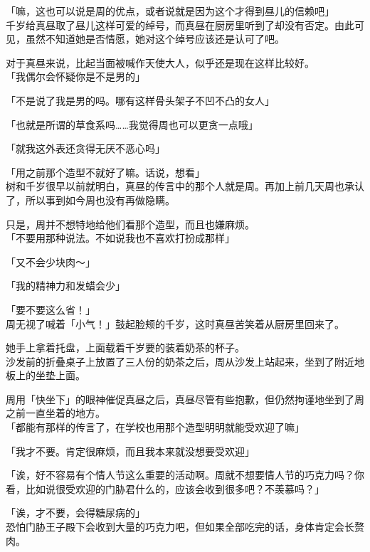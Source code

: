 「嘛，这也可以说是周的优点，或者说就是因为这个才得到昼儿的信赖吧」\\

千岁给真昼取了昼儿这样可爱的绰号，而真昼在厨房里听到了却没有否定。由此可见，虽然不知道她是否情愿，她对这个绰号应该还是认可了吧。

对于真昼来说，比起当面被喊作天使大人，似乎还是现在这样比较好。\\

「我偶尔会怀疑你是不是男的」

「不是说了我是男的吗。哪有这样骨头架子不凹不凸的女人」

「也就是所谓的草食系吗……我觉得周也可以更贪一点哦」

「就我这外表还贪得无厌不恶心吗」

「用之前那个造型不就好了嘛。话说，想看」\\

树和千岁很早以前就明白，真昼的传言中的那个人就是周。再加上前几天周也承认了，所以事到如今周也没有再做隐瞒。

只是，周并不想特地给他们看那个造型，而且也嫌麻烦。\\

「不要用那种说法。不如说我也不喜欢打扮成那样」

「又不会少块肉～」

「我的精神力和发蜡会少」

「要不要这么省！」\\

周无视了喊着「小气！」鼓起脸颊的千岁，这时真昼苦笑着从厨房里回来了。

她手上拿着托盘，上面载着千岁要的装着奶茶的杯子。\\

沙发前的折叠桌子上放置了三人份的奶茶之后，周从沙发上站起来，坐到了附近地板上的坐垫上面。

周用「快坐下」的眼神催促真昼之后，真昼尽管有些抱歉，但仍然拘谨地坐到了周之前一直坐着的地方。\\

「都能有那样的传言了，在学校也用那个造型明明就能受欢迎了嘛」

「我才不要。肯定很麻烦，而且我本来就没想要受欢迎」

「诶，好不容易有个情人节这么重要的活动啊。周就不想要情人节的巧克力吗？你看，比如说很受欢迎的门胁君什么的，应该会收到很多吧？不羡慕吗？」

「诶，才不要，会得糖尿病的」\\

恐怕门胁王子殿下会收到大量的巧克力吧，但如果全部吃完的话，身体肯定会长赘肉。\\

